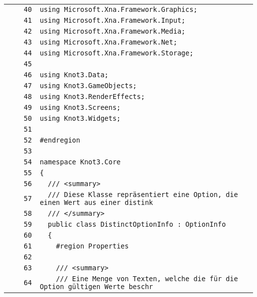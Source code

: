 \documentclass[a4paper,10pt]{article}
\begin{document}
\begin{longtable}[l]{lrrl}
\cellcolor{gray} &  & \verb~40~ & \verb~using Microsoft.Xna.Framework.Graphics;~\\
\cellcolor{gray} &  & \verb~41~ & \verb~using Microsoft.Xna.Framework.Input;~\\
\cellcolor{gray} &  & \verb~42~ & \verb~using Microsoft.Xna.Framework.Media;~\\
\cellcolor{gray} &  & \verb~43~ & \verb~using Microsoft.Xna.Framework.Net;~\\
\cellcolor{gray} &  & \verb~44~ & \verb~using Microsoft.Xna.Framework.Storage;~\\
\cellcolor{gray} &  & \verb~45~ & \verb~~\\
\cellcolor{gray} &  & \verb~46~ & \verb~using Knot3.Data;~\\
\cellcolor{gray} &  & \verb~47~ & \verb~using Knot3.GameObjects;~\\
\cellcolor{gray} &  & \verb~48~ & \verb~using Knot3.RenderEffects;~\\
\cellcolor{gray} &  & \verb~49~ & \verb~using Knot3.Screens;~\\
\cellcolor{gray} &  & \verb~50~ & \verb~using Knot3.Widgets;~\\
\cellcolor{gray} &  & \verb~51~ & \verb~~\\
\cellcolor{gray} &  & \verb~52~ & \verb~#endregion~\\
\cellcolor{gray} &  & \verb~53~ & \verb~~\\
\cellcolor{gray} &  & \verb~54~ & \verb~namespace Knot3.Core~\\
\cellcolor{gray} &  & \verb~55~ & \verb~{~\\
\cellcolor{gray} &  & \verb~56~ & \verb~  /// <summary>~\\
\cellcolor{gray} &  & \verb~57~ & \verb~  /// Diese Klasse repräsentiert eine Option, die einen Wert aus einer distink~\\
\cellcolor{gray} &  & \verb~58~ & \verb~  /// </summary>~\\
\cellcolor{gray} &  & \verb~59~ & \verb~  public class DistinctOptionInfo : OptionInfo~\\
\cellcolor{gray} &  & \verb~60~ & \verb~  {~\\
\cellcolor{gray} &  & \verb~61~ & \verb~    #region Properties~\\
\cellcolor{gray} &  & \verb~62~ & \verb~~\\
\cellcolor{gray} &  & \verb~63~ & \verb~    /// <summary>~\\
\cellcolor{gray} &  & \verb~64~ & \verb~    /// Eine Menge von Texten, welche die für die Option gültigen Werte beschr~\\

\end{longtable}
\end{document}

